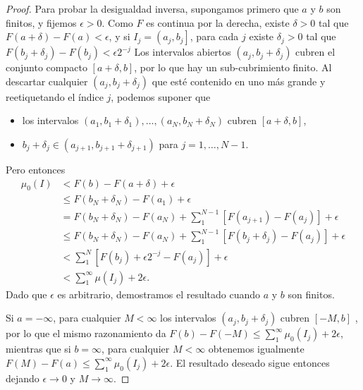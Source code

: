 \begin{proof}
Para probar la desigualdad inversa, supongamos primero que $a$ y $b$ son finitos, y fijemos $\epsilon>0$. Como $F$ es continua por la derecha, existe $\delta>0$ tal que $F(a+\delta)-F(a)<\epsilon$, y si $I_{j}=\left(a_{j} , b_{j}\right]$, para cada $j$ existe $\delta_{j}>0$ tal que $F\left(b_{j}+\delta_{j}\right)-F\left(b_{j}\right)<\epsilon 2^{-j}$ Los intervalos abiertos $\left(a_{j}, b_{j}+\delta_{j}\right)$ cubren el conjunto compacto $[a+\delta, b]$, por lo que hay un sub-cubrimiento finito. Al descartar cualquier $\left(a_{j}, b_{j}+\delta_{j}\right)$ que esté contenido en uno más grande y reetiquetando el índice $j$, podemos suponer que 
\begin{itemize}
\item  los intervalos $\left(a_{1}, b_{1}+\delta_{1}\right), \ldots,\left(a_{N}, b_{N}+\delta_{N}\right)$  cubren $[a+\delta, b]$,
\item  $b_{j}+\delta_{j} \in\left(a_{j+1}, b_{j+1}+\delta_{j+1}\right)$ para $j=1, \ldots , N-1$.
\end{itemize}
Pero entonces
$$
\begin{aligned}
\mu_{0}(I) &<F(b)-F(a+\delta)+\epsilon \\
& \leq F\left(b_{N}+\delta_{N}\right)-F\left(a_{1}\right)+\epsilon \\
&=F\left(b_{N}+\delta_{N}\right)-F\left(a_{N}\right)+\sum_{1}^{N-1}\left[F\left( a_{j+1}\right)-F\left(a_{j}\right)\right]+\epsilon \\
& \leq F\left(b_{N}+\delta_{N}\right)-F\left(a_{N}\right)+\sum_{1}^{N-1}\left[F\left (b_{j}+\delta_{j}\right)-F\left(a_{j}\right)\right]+\epsilon \\
&<\sum_{1}^{N}\left[F\left(b_{j}\right)+\epsilon 2^{-j}-F\left(a_{j}\right)\right]+ \epsilon \\
&<\sum_{1}^{\infty} \mu\left(I_{j}\right)+2 \epsilon .
\end{aligned}
$$
Dado que $\epsilon$ es arbitrario, demostramos el resultado cuando $a$ y $b$ son finitos. 

Si $a=-\infty$, para cualquier $M<\infty$ los intervalos $\left(a_{j}, b_{j}+\delta_{j}\right)$ cubren $[-M, b]$ , por lo que el mismo razonamiento da $F(b)-F(-M) \leq \sum_{1}^{\infty} \mu_{0}\left(I_{j}\right)+2 \epsilon$, mientras que si $b=\infty$, para cualquier $M<\infty$ obtenemos igualmente $F(M)-F(a) \leq \sum_{1}^{\infty} \mu_{0}\left( I_{j}\right)+2 \epsilon$. El resultado deseado sigue entonces dejando $\epsilon \rightarrow 0$ y $M \rightarrow \infty$.
\end{proof}


